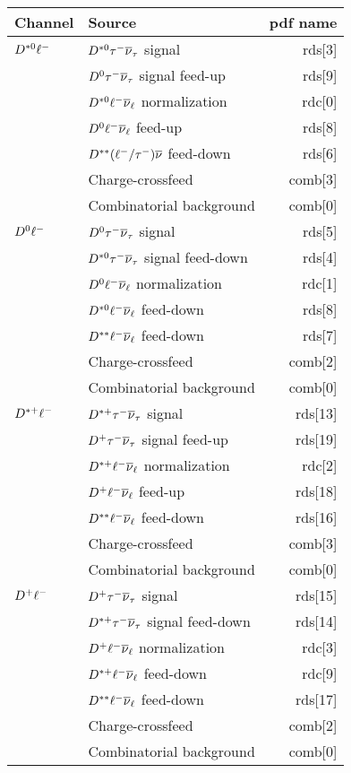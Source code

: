 \documentclass[10pt,twocolumn]{article}
\begin{document}
\begin{tabular}{l l r}\\ \hline\hline
Channel          & Source  & pdf name\\ \hline
$D^{*0}\ell^-$   & $D^{*0}\tau^-\overline{\nu}_\tau$ signal           & rds[3]   \\
                 & $D^0\tau^-\overline{\nu}_\tau$ signal feed-up       & rds[9] \\
                 & $D^{*0}\ell^-\overline{\nu}_\ell$ normalization    & rdc[0]  \\
                 & $D^0\ell^-\overline{\nu}_\ell$ feed-up              & rds[8]   \\
                 & $D^{**}(\ell^-/\tau^-)\overline{\nu}$ feed-down  & rds[6]   \\
                 & Charge-crossfeed                     & comb[3] \\
                 & Combinatorial background             & comb[0] \\ \hline
$D^0\ell^-$       & $D^0\tau^-\overline{\nu}_\tau$ signal               & rds[5] \\
                 & $D^{*0}\tau^-\overline{\nu}_\tau$ signal feed-down & rds[4] \\
                 & $D^0\ell^-\overline{\nu}_\ell$ normalization        & rdc[1] \\
                 & $D^{*0}\ell^-\overline{\nu}_\ell$ feed-down        & rds[8] \\
                 & $D^{**}\ell^-\overline{\nu}_\ell$ feed-down         & rds[7] \\
                 & Charge-crossfeed                     & comb[2] \\
                 & Combinatorial background             & comb[0] \\ \hline
$D^{*+}\ell^-$   & $D^{*+}\tau^-\overline{\nu}_\tau$ signal           & rds[13] \\
                 & $D^+\tau^-\overline{\nu}_\tau$ signal feed-up       & rds[19] \\
                 & $D^{*+}\ell^-\overline{\nu}_\ell$ normalization    & rdc[2] \\
                 & $D^+\ell^-\overline{\nu}_\ell$ feed-up              & rds[18]   \\
                 & $D^{**}\ell^-\overline{\nu}_\ell$ feed-down         & rds[16] \\
                 & Charge-crossfeed                     & comb[3] \\
                 & Combinatorial background             & comb[0] \\ \hline
$D^+\ell^-$       & $D^+\tau^-\overline{\nu}_\tau$ signal               & rds[15] \\
                 & $D^{*+}\tau^-\overline{\nu}_\tau$ signal feed-down & rds[14] \\
                 & $D^+\ell^-\overline{\nu}_\ell$ normalization        & rdc[3] \\
                 & $D^{*+}\ell^-\overline{\nu}_\ell$ feed-down        & rdc[9] \\
                 & $D^{**}\ell^-\overline{\nu}_\ell$ feed-down         & rds[17] \\
                 & Charge-crossfeed                     & comb[2] \\
                 & Combinatorial background             & comb[0] \\ \hline\hline
\end{tabular}
\end{document}

